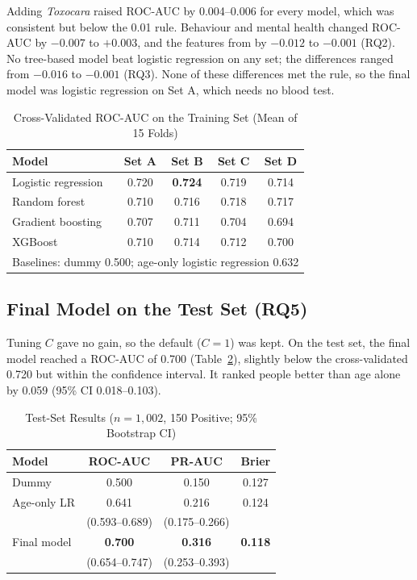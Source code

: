 \documentclass[conference]{IEEEtran}
\begin{document}
Adding \textit{Toxocara} raised ROC-AUC by 0.004--0.006 for every model, which was consistent but below the 0.01 rule. Behaviour and mental health changed ROC-AUC by $-0.007$ to $+0.003$, and the features from \cite{ichwan} by $-0.012$ to $-0.001$ (RQ2). No tree-based model beat logistic regression on any set; the differences ranged from $-0.016$ to $-0.001$ (RQ3). None of these differences met the rule, so the final model was logistic regression on Set A, which needs no blood test.

\begin{table}[t]
\caption{Cross-Validated ROC-AUC on the Training Set (Mean of 15 Folds)}
\label{tab:cv}
\centering
\small
\begin{tabular}{lcccc}
\toprule
Model & Set A & Set B & Set C & Set D \\
\midrule
Logistic regression & 0.720 & \textbf{0.724} & 0.719 & 0.714 \\
Random forest & 0.710 & 0.716 & 0.718 & 0.717 \\
Gradient boosting & 0.707 & 0.711 & 0.704 & 0.694 \\
XGBoost & 0.710 & 0.714 & 0.712 & 0.700 \\
\midrule
\multicolumn{5}{l}{Baselines: dummy 0.500; age-only logistic regression 0.632} \\
\bottomrule
\end{tabular}
\end{table}

\subsection{Final Model on the Test Set (RQ5)}
Tuning $C$ gave no gain, so the default ($C=1$) was kept. On the test set, the final model reached a ROC-AUC of 0.700 (Table~\ref{tab:test}), slightly below the cross-validated 0.720 but within the confidence interval. It ranked people better than age alone by 0.059 (95\% CI 0.018--0.103).

\begin{table}[t]
\caption{Test-Set Results ($n=1{,}002$, 150 Positive; 95\% Bootstrap CI)}
\label{tab:test}
\centering
\small
\begin{tabular}{lccc}
\toprule
Model & ROC-AUC & PR-AUC & Brier \\
\midrule
Dummy & 0.500 & 0.150 & 0.127 \\
Age-only LR & 0.641 & 0.216 & 0.124 \\
 & (0.593--0.689) & (0.175--0.266) & \\
Final model & \textbf{0.700} & \textbf{0.316} & \textbf{0.118} \\
 & (0.654--0.747) & (0.253--0.393) & \\
\bottomrule
\end{tabular}
\end{table}
\end{document}
